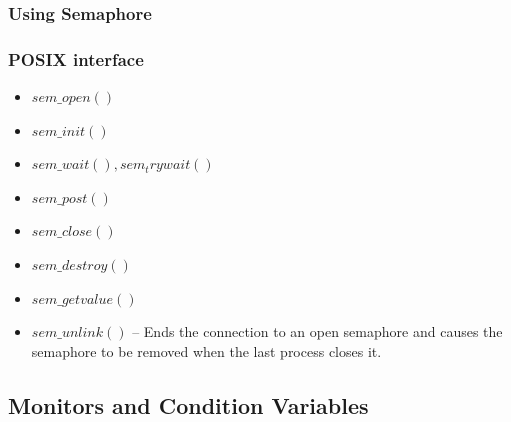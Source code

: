 \documentclass[12pt]{article}
\begin{document}
\subsubsection{Using Semaphore}
\subsubsection{POSIX interface}
\begin{itemize}
    \item $sem\_open()$
    \item $sem\_init()$
    \item $sem\_wait(), sem_trywait()$
    \item $sem\_post()$
    \item $sem\_close()$
    \item $sem\_destroy()$
    \item $sem\_getvalue()$
    \item $sem\_unlink()$ -- Ends the connection to an open semaphore and causes the semaphore to be removed when the last process closes it.
\end{itemize}

\subsection{Monitors and Condition Variables}
\end{document}
